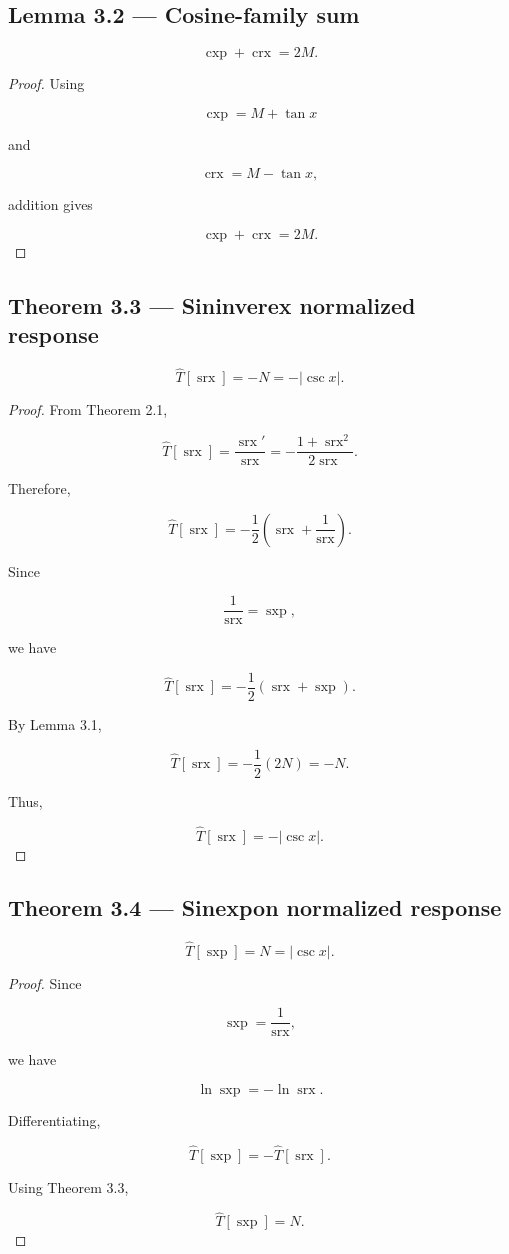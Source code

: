 \documentclass[11pt,oneside,openany]{book}
\newcommand{\PCsubsection}[1]{%
  \subsection*{#1}%
}
\begin{document}
\PCsubsection{Lemma 3.2 --- Cosine-family sum}

\[
\boxed{ \operatorname{cxp} + \operatorname{crx} = 2M }.
\]

\begin{proof}
Using

\[
\operatorname{cxp} = M+\tan x
\]

and

\[
\operatorname{crx} = M-\tan x,
\]

addition gives

\[
\operatorname{cxp} + \operatorname{crx} = 2M.
\]

\end{proof}

\PCsubsection{Theorem 3.3 --- Sininverex normalized response}

\[
\boxed{ \widehat T[\operatorname{srx}] = -N = -|\csc x| }.
\]

\begin{proof}
From Theorem 2.1,

\[
\widehat T[\operatorname{srx}] = \frac{\operatorname{srx}'} {\operatorname{srx}} = -\frac{1+\operatorname{srx}^2} {2\operatorname{srx}}.
\]

Therefore,

\[
\widehat T[\operatorname{srx}] = -\frac12 \left( \operatorname{srx} + \frac1{\operatorname{srx}} \right).
\]

Since

\[
\frac1{\operatorname{srx}} = \operatorname{sxp},
\]

we have

\[
\widehat T[\operatorname{srx}] = -\frac12 \left( \operatorname{srx} + \operatorname{sxp} \right).
\]

By Lemma 3.1,

\[
\widehat T[\operatorname{srx}] = -\frac12(2N) = -N.
\]

Thus,

\[
\boxed{ \widehat T[\operatorname{srx}] = -|\csc x| }.
\]

\end{proof}

\PCsubsection{Theorem 3.4 --- Sinexpon normalized response}

\[
\boxed{ \widehat T[\operatorname{sxp}] = N = |\csc x| }.
\]

\begin{proof}
Since

\[
\operatorname{sxp} = \frac1{\operatorname{srx}},
\]

we have

\[
\ln\operatorname{sxp} = -\ln\operatorname{srx}.
\]

Differentiating,

\[
\widehat T[\operatorname{sxp}] = -\widehat T[\operatorname{srx}].
\]

Using Theorem 3.3,

\[
\widehat T[\operatorname{sxp}] = N.
\]

\end{proof}
\end{document}
